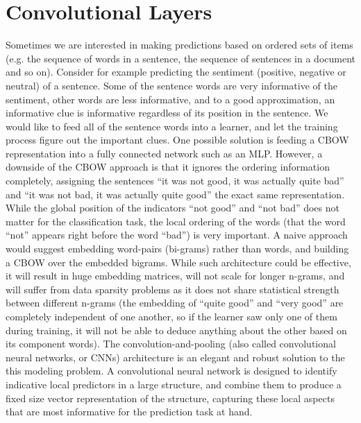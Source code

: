 \documentclass[jair,twoside,11pt,theapa]{article}
\begin{document}
{\clearpage
\section{Convolutional Layers}
\label{sec:convnet}


Sometimes we are interested in making predictions based on ordered sets of items
(e.g. the sequence of words in a sentence, the sequence of sentences in a
document and so on).  Consider for example predicting the sentiment (positive,
negative or neutral) of a sentence.  Some of the sentence words are very
informative of the sentiment, other words are less informative, and to a good
approximation, an informative clue is informative regardless of its position in
the sentence.  We would like to feed all of the sentence words into a learner,
and let the training process figure out the important clues.  One possible
solution is feeding a CBOW representation into a fully connected
network such as an MLP.  However, a downside of the CBOW approach is that it
ignores the ordering information completely, assigning the sentences ``it was
not good, it was actually quite bad'' and ``it was not bad, it was actually
quite good'' the exact same representation.  While the global position of the
indicators ``not good'' and ``not bad'' does not matter for the classification
task, the local ordering of the words (that the word ``not'' appears right
before the word ``bad'') is very important.  A naive approach would suggest
embedding word-pairs (bi-grams) rather than words, and building a CBOW over the
embedded bigrams.  While such architecture could be effective, it will result in
huge embedding matrices, will not scale for longer n-grams, and will suffer from
data sparsity problems as it does not share statistical strength between
different n-grams (the embedding of ``quite good'' and ``very good'' are
completely independent of one another, so if the learner saw only one of them
during training, it will not be able to deduce anything about the other based on
its component words).  The convolution-and-pooling (also called convolutional
neural networks, or CNNs) architecture is an elegant and robust solution to the
this modeling problem.  A convolutional neural network is designed to identify
indicative local predictors in a large structure, and combine them to produce a
fixed size vector representation of the structure, capturing these local aspects
that are most informative for the prediction task at hand.

}
\end{document}
